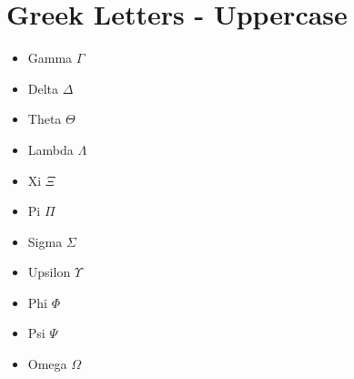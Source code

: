 \documentclass[11pt]{article}  %
\begin{document}
\section*{Greek Letters - Uppercase}
\begin{itemize}
\item Gamma $\Gamma$
\item Delta $\Delta$
\item Theta $\Theta$
\item Lambda $\Lambda$
\item Xi $\Xi$
\item Pi $\Pi$
\item Sigma $\Sigma$
\item Upsilon $\Upsilon$
\item Phi $\Phi$
\item Psi $\Psi$
\item Omega $\Omega$
\end{itemize}
\end{document}
